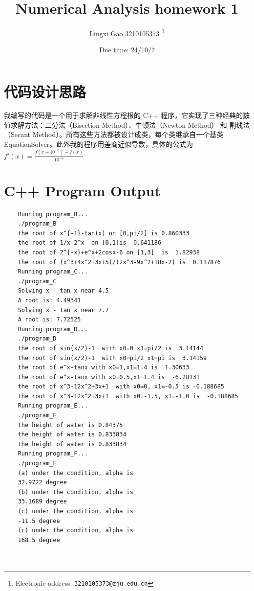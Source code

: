 \documentclass[a4paper]{article}
\begin{document}
\title{Numerical Analysis homework 1}

\author{Lingxi Gao 3210105373
  \thanks{Electronic address: \texttt{3210105373@zju.edu.cn}}}


\date{Due time: 24/10/7}

\maketitle






\section*{代码设计思路}
我编写的代码是一个用于求解非线性方程根的 C++ 程序，它实现了三种经典的数值求解方法：二分法（Bisection Method）、牛顿法（Newton Method） 和 割线法（Secant Method）。所有这些方法都被设计成类，每个类继承自一个基类 EquationSolver。此外我的程序用差商近似导数，具体的公式为${f}'(x)=\frac{f(x+10^{-6})-f(x)}{10^{-6}}$


\section*{C++ Program Output}

\begin{verbatim}
	Running program_B...
	./program_B
	the root of x^{-1}-tan(x) on [0,pi/2] is 0.860333
	the root of 1/x-2^x  on [0,1]is  0.641186
	the root of 2^{-x}+e^x+2cosx-6 on [1,3]  is  1.82938
	the root of (x^3+4x^2+3x+5)/(2x^3-9x^2+18x-2) is  0.117876
	Running program_C...
	./program_C
	Solving x - tan x near 4.5
	A root is: 4.49341
	Solving x - tan x near 7.7
	A root is: 7.72525
	Running program_D...
	./program_D
	the root of sin(x/2)-1  with x0=0 x1=pi/2 is  3.14144
	the root of sin(x/2)-1  with x0=pi/2 x1=pi is  3.14159
	the root of e^x-tanx with x0=1,x1=1.4 is  1.30633
	the root of e^x-tanx with x0=0.5,x1=1.4 is  -6.28131
	the root of x^3-12x^2+3x+1  with x0=0, x1=-0.5 is -0.188685
	the root of x^3-12x^2+3x+1  with x0=-1.5, x1=-1.0 is  -0.188685
	Running program_E...
	./program_E
	the height of water is 0.84375
	the height of water is 0.833834
	the height of water is 0.833834
	Running program_F...
	./program_F
	(a) under the condition, alpha is 
	32.9722 degree
	(b) under the condition, alpha is 
	33.1689 degree
	(c) under the condition, alpha is 
	-11.5 degree
	(c) under the condition, alpha is 
	168.5 degree
	
	
\end{verbatim}
\end{document}
